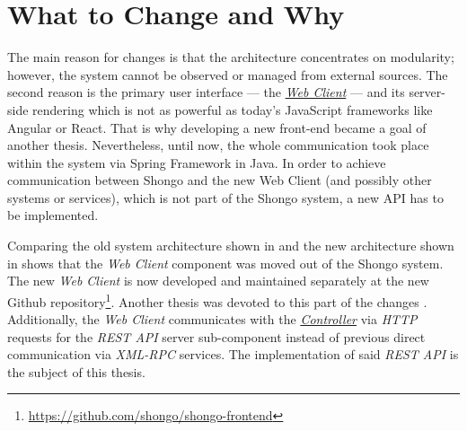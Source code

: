 \section{What to Change and Why}

The main reason for changes is that the architecture concentrates on modularity; however, the system cannot be observed or managed from external sources.
The second reason is the primary user interface --- the \hyperref[webclient]{\emph{Web Client}} --- and its server-side rendering which is not as powerful as today's JavaScript frameworks like Angular or React.
That is why developing a new front-end became a goal of another thesis. \cite{drobnakm}
Nevertheless, until now, the whole communication took place within the system via Spring Framework in Java. In order to achieve communication between Shongo and the new Web Client (and possibly other systems or services), which is not part of the Shongo system, a new API has to be implemented.


Comparing the old system architecture shown in  and the new architecture shown in  shows that the \emph{Web Client} component was moved out of the Shongo system. The new \emph{Web Client} is now developed and maintained separately at the new Github repository\footnote{\url{https://github.com/shongo/shongo-frontend}}. Another thesis was devoted to this part of the changes \cite{drobnakm}.
Additionally, the \emph{Web Client} communicates with the \hyperref[controller]{\emph{Controller}} via \emph{HTTP} requests for the \emph{REST API} server sub-component instead of previous direct communication via \emph{XML-RPC} services. The implementation of said \emph{REST API} is the subject of this thesis.
